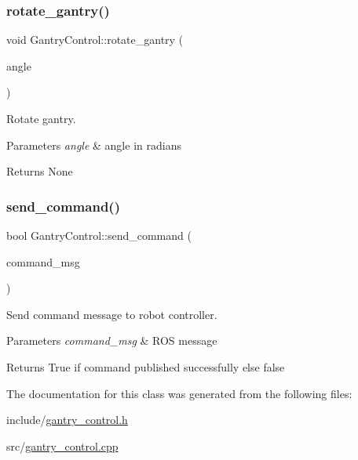 \subsubsection{\texorpdfstring{rotate\+\_\+gantry()}{rotate\_gantry()}}
{\footnotesize\ttfamily void Gantry\+Control\+::rotate\+\_\+gantry (\begin{DoxyParamCaption}\item[{double}]{angle }\end{DoxyParamCaption})}



Rotate gantry. 


\begin{DoxyParams}{Parameters}
{\em angle} & angle in radians \\
\hline
\end{DoxyParams}
\begin{DoxyReturn}{Returns}
None 
\end{DoxyReturn}
\mbox{\label{classGantryControl_ab271ce06b0d336eddb26e1ba5a2ce594}} 
\subsubsection{\texorpdfstring{send\+\_\+command()}{send\_command()}}
{\footnotesize\ttfamily bool Gantry\+Control\+::send\+\_\+command (\begin{DoxyParamCaption}\item[{trajectory\+\_\+msgs\+::\+Joint\+Trajectory}]{command\+\_\+msg }\end{DoxyParamCaption})}



Send command message to robot controller. 


\begin{DoxyParams}{Parameters}
{\em command\+\_\+msg} & R\+OS message \\
\hline
\end{DoxyParams}
\begin{DoxyReturn}{Returns}
True if command published successfully else false 
\end{DoxyReturn}


The documentation for this class was generated from the following files\+:\begin{DoxyCompactItemize}
\item 
include/\hyperlink{gantry__control_8h}{gantry\+\_\+control.\+h}\item 
src/\hyperlink{gantry__control_8cpp}{gantry\+\_\+control.\+cpp}\end{DoxyCompactItemize}

